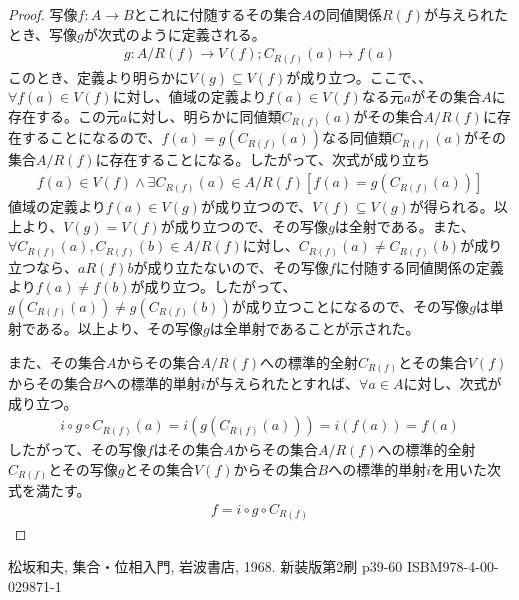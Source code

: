 \documentclass[dvipdfmx]{jsarticle}
\begin{document}
\begin{proof}
写像$f:A \rightarrow B$とこれに付随するその集合$A$の同値関係$R(f)$が与えられたとき、写像$g$が次式のように定義される。
\begin{align*}
g:A/R(f)\rightarrow V(f);C_{R(f)}(a) \mapsto f(a)
\end{align*}
このとき、定義より明らかに$V(g) \subseteq V(f)$が成り立つ。ここで、、$\forall f(a) \in V(f)$に対し、値域の定義より$f(a) \in V(f)$なる元$a$がその集合$A$に存在する。この元$a$に対し、明らかに同値類$C_{R(f)}(a)$がその集合$A/R(f)$に存在することになるので、$f(a) = g\left( C_{R(f)}(a) \right)$なる同値類$C_{R(f)}(a)$がその集合$A/R(f)$に存在することになる。したがって、次式が成り立ち
\begin{align*}
f(a) \in V(f) \land \exists C_{R(f)}(a) \in A/R(f)\left[ f(a) = g\left( C_{R(f)}(a) \right) \right]
\end{align*}
値域の定義より$f(a) \in V(g)$が成り立つので、$V(f) \subseteq V(g)$が得られる。以上より、$V(g) = V(f)$が成り立つので、その写像$g$は全射である。また、$\forall C_{R(f)}(a),C_{R(f)}(b) \in A/R(f)$に対し、$C_{R(f)}(a) \neq C_{R(f)}(b)$が成り立つなら、$aR(f)b$が成り立たないので、その写像$f$に付随する同値関係の定義より$f(a) \neq f(b)$が成り立つ。したがって、$g\left( C_{R(f)}(a) \right) \neq g\left( C_{R(f)}(b) \right)$が成り立つことになるので、その写像$g$は単射である。以上より、その写像$g$は全単射であることが示された。\par
また、その集合$A$からその集合$A/R(f)$への標準的全射$C_{R(f)}$とその集合$V(f)$からその集合$B$への標準的単射$i$が与えられたとすれば、$\forall a \in A$に対し、次式が成り立つ。
\begin{align*}
i \circ g \circ C_{R(f)}(a) = i\left( g\left( C_{R(f)}(a) \right) \right) = i\left( f(a) \right) = f(a)
\end{align*}
したがって、その写像$f$はその集合$A$からその集合$A/R(f)$への標準的全射$C_{R(f)}$とその写像$g$とその集合$V(f)$からその集合$B$への標準的単射$i$を用いた次式を満たす。
\begin{align*}
f = i \circ g \circ C_{R(f)}
\end{align*}
\end{proof}
\begin{thebibliography}{50}
  松坂和夫, 集合・位相入門, 岩波書店, 1968. 新装版第2刷 p39-60 ISBM978-4-00-029871-1
\end{thebibliography}
\end{document}
